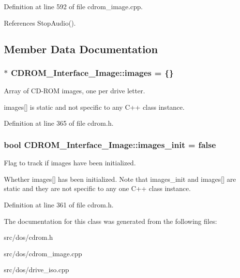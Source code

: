 Definition at line 592 of file cdrom\-\_\-image.\-cpp.



References Stop\-Audio().



\subsection{Member Data Documentation}
\hypertarget{classCDROM__Interface__Image_a547a33f528bf5f50063af1def199a7a3}{
\subsubsection[{images}]{ $\ast$ {\bf C\-D\-R\-O\-M\-\_\-\-Interface\-\_\-\-Image\-::images} = \{\}}}\label{classCDROM__Interface__Image_a547a33f528bf5f50063af1def199a7a3}


Array of C\-D-\/\-R\-O\-M images, one per drive letter. 

images\mbox{[}\mbox{]} is static and not specific to any C++ class instance. 

Definition at line 365 of file cdrom.\-h.

\hypertarget{classCDROM__Interface__Image_a901be8d60520cf91bcabeb67a808c644}{
\subsubsection[{images\-\_\-init}]{\setlength{\rightskip}{0pt plus 5cm}bool {\bf C\-D\-R\-O\-M\-\_\-\-Interface\-\_\-\-Image\-::images\-\_\-init} = false}}\label{classCDROM__Interface__Image_a901be8d60520cf91bcabeb67a808c644}


Flag to track if images have been initialized. 

Whether images\mbox{[}\mbox{]} has been initialized. Note that images\-\_\-init and images\mbox{[}\mbox{]} are static and they are not specific to any one C++ class instance. 

Definition at line 361 of file cdrom.\-h.



The documentation for this class was generated from the following files\-:\begin{DoxyCompactItemize}
\item 
src/dos/cdrom.\-h\item 
src/dos/cdrom\-\_\-image.\-cpp\item 
src/dos/drive\-\_\-iso.\-cpp\end{DoxyCompactItemize}
